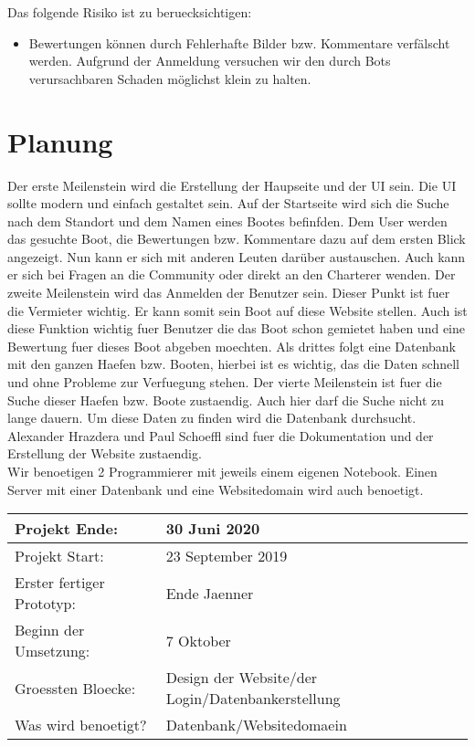 \documentclass[12pt]{article}
\theoremstyle{definition}
\begin{document}
Das folgende Risiko ist zu beruecksichtigen:
\begin{itemize}
\item Bewertungen können durch Fehlerhafte Bilder bzw. Kommentare verfälscht werden. Aufgrund der Anmeldung versuchen wir den durch Bots verursachbaren Schaden möglichst klein zu halten.
\end{itemize}

\pagebreak

\section{Planung}
Der erste Meilenstein wird die Erstellung der Haupseite und der UI sein.
Die UI sollte modern und einfach gestaltet sein. Auf der Startseite wird sich die Suche nach dem Standort und dem Namen eines Bootes befinfden. Dem User werden das gesuchte Boot, die Bewertungen bzw. Kommentare dazu auf dem ersten Blick angezeigt. Nun kann er sich mit anderen Leuten darüber austauschen. Auch kann er sich bei Fragen an die Community oder direkt an den Charterer wenden. 
Der zweite Meilenstein wird das Anmelden der Benutzer sein. Dieser Punkt ist fuer die Vermieter wichtig. Er kann somit sein Boot auf diese Website stellen. Auch ist diese Funktion wichtig fuer Benutzer die das Boot schon gemietet haben und eine Bewertung fuer dieses Boot abgeben moechten.
Als drittes folgt eine Datenbank mit den ganzen Haefen bzw. Booten, hierbei ist es wichtig, das die Daten schnell und ohne Probleme zur Verfuegung stehen. Der vierte Meilenstein ist fuer die Suche dieser Haefen bzw. Boote zustaendig. Auch hier darf die Suche nicht zu lange dauern. Um diese Daten zu finden wird die Datenbank durchsucht.\\ Alexander Hrazdera und Paul Schoeffl sind fuer die Dokumentation und der Erstellung der Website zustaendig.\\ Wir benoetigen 2 Programmierer mit jeweils einem eigenen Notebook. Einen Server mit einer Datenbank und eine Websitedomain wird auch benoetigt.

\newcommand{\projektend}{30 Juni 2020}
\newcommand{\projectstart}{23 September 2019}
\newcommand{\firstresult}{Ende Jaenner}
\newcommand{\beginofprog}{7 Oktober}
\newcommand{\bigBlocks}{Design der Website/der Login/Datenbankerstellung}
\newcommand{\whatisneeded}{Datenbank/Websitedomaein}

\begin{flushleft} 
\begin{tabular}{|l|l|}
\hline
Projekt Ende: & \projektend \\ \hline
Projekt Start: & \projectstart \\ \hline
Erster fertiger Prototyp: & \firstresult \\ \hline
Beginn der Umsetzung: & \beginofprog \\ \hline
Groessten Bloecke: & \bigBlocks \\ \hline
Was wird benoetigt? & \whatisneeded \\ \hline
\end{tabular}
\end{flushleft}
\cite{wikipedia_2016}
{}

\end{document}
